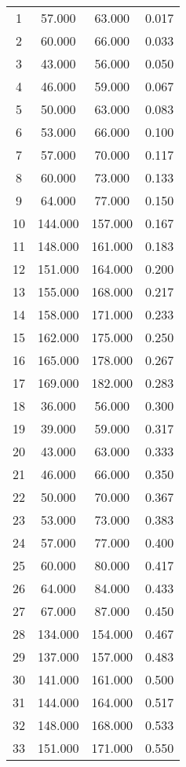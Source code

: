 % 
\begin{tabular}{cccc}
  \hline
  \hline
1 & 57.000 & 63.000 & 0.017 \\ 
  2 & 60.000 & 66.000 & 0.033 \\ 
  3 & 43.000 & 56.000 & 0.050 \\ 
  4 & 46.000 & 59.000 & 0.067 \\ 
  5 & 50.000 & 63.000 & 0.083 \\ 
  6 & 53.000 & 66.000 & 0.100 \\ 
  7 & 57.000 & 70.000 & 0.117 \\ 
  8 & 60.000 & 73.000 & 0.133 \\ 
  9 & 64.000 & 77.000 & 0.150 \\ 
  10 & 144.000 & 157.000 & 0.167 \\ 
  11 & 148.000 & 161.000 & 0.183 \\ 
  12 & 151.000 & 164.000 & 0.200 \\ 
  13 & 155.000 & 168.000 & 0.217 \\ 
  14 & 158.000 & 171.000 & 0.233 \\ 
  15 & 162.000 & 175.000 & 0.250 \\ 
  16 & 165.000 & 178.000 & 0.267 \\ 
  17 & 169.000 & 182.000 & 0.283 \\ 
  18 & 36.000 & 56.000 & 0.300 \\ 
  19 & 39.000 & 59.000 & 0.317 \\ 
  20 & 43.000 & 63.000 & 0.333 \\ 
  21 & 46.000 & 66.000 & 0.350 \\ 
  22 & 50.000 & 70.000 & 0.367 \\ 
  23 & 53.000 & 73.000 & 0.383 \\ 
  24 & 57.000 & 77.000 & 0.400 \\ 
  25 & 60.000 & 80.000 & 0.417 \\ 
  26 & 64.000 & 84.000 & 0.433 \\ 
  27 & 67.000 & 87.000 & 0.450 \\ 
  28 & 134.000 & 154.000 & 0.467 \\ 
  29 & 137.000 & 157.000 & 0.483 \\ 
  30 & 141.000 & 161.000 & 0.500 \\ 
  31 & 144.000 & 164.000 & 0.517 \\ 
  32 & 148.000 & 168.000 & 0.533 \\ 
  33 & 151.000 & 171.000 & 0.550 \\ 

\end{tabular}
